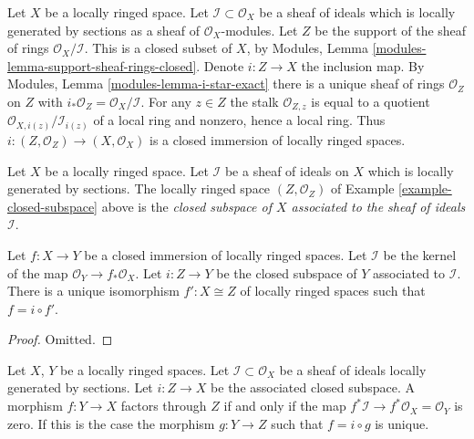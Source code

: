 \begin{example}
\label{example-closed-subspace}
Let $X$ be a locally ringed space.
Let $\mathcal{I} \subset \mathcal{O}_X$ be a sheaf
of ideals which is locally generated by sections as a sheaf
of $\mathcal{O}_X$-modules. Let $Z$ be the support of
the sheaf of rings $\mathcal{O}_X/\mathcal{I}$.
This is a closed subset of $X$, by
Modules, Lemma \ref{modules-lemma-support-sheaf-rings-closed}.
Denote $i : Z \to X$ the inclusion map.
By Modules, Lemma \ref{modules-lemma-i-star-exact}
there is a unique sheaf of rings $\mathcal{O}_Z$ on $Z$
with $i_*\mathcal{O}_Z = \mathcal{O}_X/\mathcal{I}$.
For any $z \in Z$ the stalk $\mathcal{O}_{Z, z}$
is equal to a quotient $\mathcal{O}_{X, i(z)}/\mathcal{I}_{i(z)}$
of a local ring and nonzero, hence a local ring.
Thus $i : (Z, \mathcal{O}_Z) \to (X, \mathcal{O}_X)$ is
a closed immersion of locally ringed spaces.
\end{example}

\begin{definition}
\label{definition-closed-subspace}
Let $X$ be a locally ringed space.
Let $\mathcal{I}$ be a sheaf of ideals on $X$
which is locally generated by sections.
The locally ringed space $(Z, \mathcal{O}_Z)$
of Example \ref{example-closed-subspace} above
is the {\it closed subspace of $X$ associated to
the sheaf of ideals $\mathcal{I}$}.
\end{definition}

\begin{lemma}
\label{lemma-closed-immersion}
Let $f : X \to Y$ be a closed immersion of
locally ringed spaces. Let $\mathcal{I}$ be the
kernel of the map $\mathcal{O}_Y \to f_*\mathcal{O}_X$.
Let $i : Z \to Y$ be the closed subspace of $Y$
associated to $\mathcal{I}$.
There is a unique isomorphism $f' : X \cong Z$ of
locally ringed spaces such that $f = i \circ f'$.
\end{lemma}

\begin{proof}
Omitted.
\end{proof}

\begin{lemma}
\label{lemma-characterize-closed-subspace}
Let $X$, $Y$ be a locally ringed spaces. Let
$\mathcal{I} \subset \mathcal{O}_X$ be a sheaf of ideals locally generated
by sections. Let $i : Z \to X$ be the associated closed subspace.
A morphism $f : Y \to X$ factors through $Z$ if and only if the map
$f^*\mathcal{I} \to f^*\mathcal{O}_X = \mathcal{O}_Y$
is zero. If this is the case the morphism $g : Y \to Z$
such that $f = i \circ g$ is unique.
\end{lemma}

